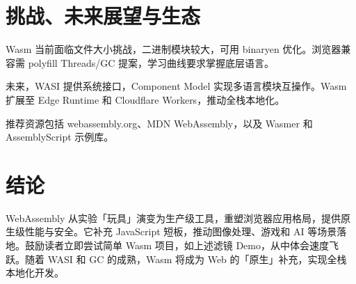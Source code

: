 \chapter{挑战、未来展望与生态}
Wasm 当前面临文件大小挑战，二进制模块较大，可用 binaryen 优化。浏览器兼容需 polyfill Threads/GC 提案，学习曲线要求掌握底层语言。\par
未来，WASI 提供系统接口，Component Model 实现多语言模块互操作。Wasm 扩展至 Edge Runtime 和 Cloudflare Workers，推动全栈本地化。\par
推荐资源包括 webassembly.org、MDN WebAssembly，以及 Wasmer 和 AssemblyScript 示例库。\par
\chapter{结论}
WebAssembly 从实验「玩具」演变为生产级工具，重塑浏览器应用格局，提供原生级性能与安全。它补充 JavaScript 短板，推动图像处理、游戏和 AI 等场景落地。鼓励读者立即尝试简单 Wasm 项目，如上述滤镜 Demo，从中体会速度飞跃。随着 WASI 和 GC 的成熟，Wasm 将成为 Web 的「原生」补充，实现全栈本地化开发。\par
